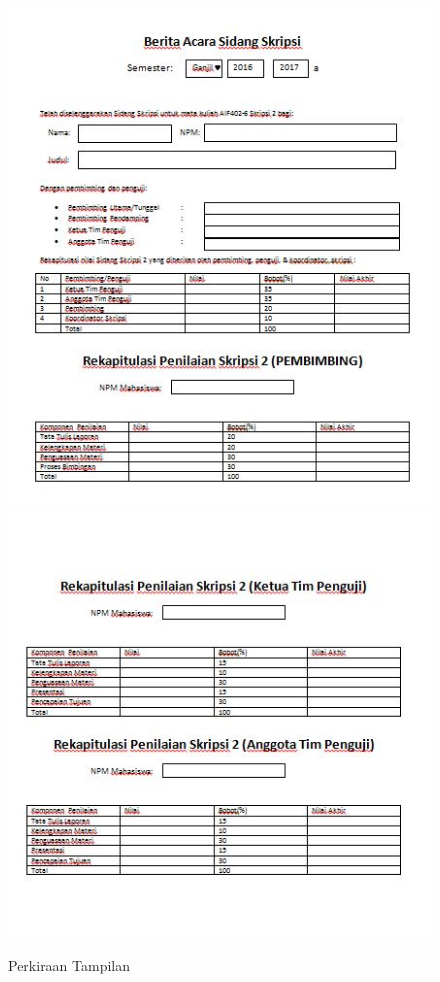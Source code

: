 	\begin{figure}[H]
		\centering
		\includegraphics[scale=0.75]{Gambar/tampilan1}
		\includegraphics[scale=0.75]{Gambar/tampilan2}
		\caption{Perkiraan Tampilan}
		\label{fig:tampilan}
	\end{figure}
	
